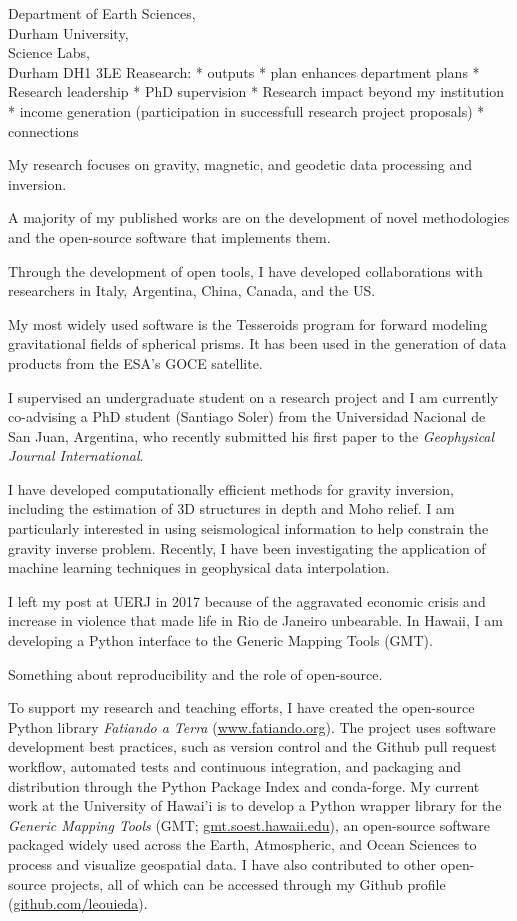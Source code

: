 \documentclass[11pt]{letter}
\begin{document}
\begin{letter}{
        Department of Earth Sciences,  \\
        Durham University, \\
        Science Labs, \\
        Durham DH1 3LE
}
Reasearch:
* outputs
* plan enhances department plans
* Research leadership
* PhD supervision
* Research impact beyond my institution
* income generation (participation in successfull research project proposals)
* connections

My research focuses on gravity, magnetic, and geodetic data processing and inversion.

A majority of my published works are on the development of novel methodologies and the
open-source software that implements them.

Through the development of open tools, I have developed collaborations with researchers
in Italy, Argentina, China, Canada, and the US.

My most widely used software is the Tesseroids program for forward modeling
gravitational fields of spherical prisms.
It has been used in the generation of data products from the ESA's GOCE satellite.

I supervised an undergraduate student on a research project and I am currently
co-advising a PhD student (Santiago Soler) from the Universidad Nacional de San Juan,
Argentina, who recently submitted his first paper to the \textit{Geophysical Journal
International}.

I have developed computationally efficient methods for gravity inversion, including
the estimation of 3D structures in depth and Moho relief.
I am particularly interested in using seismological information to help constrain the
gravity inverse problem.
Recently, I have been investigating the application of machine learning techniques in
geophysical data interpolation.

I left my post at UERJ in 2017 because of the aggravated economic crisis and increase
in violence that made life in Rio de Janeiro unbearable.
In Hawaii, I am developing a Python interface to the Generic Mapping Tools (GMT).

Something about reproducibility and the role of open-source.


To support my research and teaching efforts, I have created the open-source
Python library \textit{Fatiando a Terra}
(\href{http://www.fatiando.org/}{www.fatiando.org}).
The project uses software development best practices, such as version control
and the Github pull request workflow,
automated tests and continuous integration,
and packaging and distribution through the Python Package Index and
conda-forge.
My current work at the University of Hawai'i is to develop a Python wrapper
library for the \textit{Generic Mapping Tools}
(GMT; \href{http://gmt.soest.hawaii.edu/}{gmt.soest.hawaii.edu}),
an open-source software packaged widely used across the Earth, Atmospheric, and
Ocean Sciences to process and visualize geospatial data.
I have also contributed to other open-source projects, all of which can be
accessed through my Github profile
(\href{https://github.com/leouieda/}{github.com/leouieda}).


\end{letter}
\end{document}
